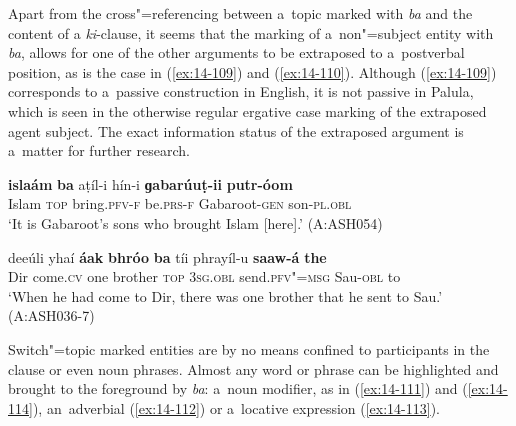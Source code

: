 Apart from the cross"=referencing between a~topic marked with \textit{ba} and the content of a \textit{ki}-clause, it seems that the marking of a~non"=subject entity with \textit{ba}, allows for one of the other arguments to be extraposed to a~postverbal position, as is the case in (\ref{ex:14-109}) and (\ref{ex:14-110}). Although (\ref{ex:14-109}) corresponds to a~passive construction in English, it is not passive in Palula, which is seen in the otherwise regular ergative case marking of the extraposed agent subject. The exact information status of the extraposed argument is a~matter for further research.

\begin{exe}
\ex
\label{ex:14-109}
\gll \textbf{islaám} \textbf{ba} aṭíl-i hín-i \textbf{ɡabarúuṭ-ii} \textbf{putr-óom}\\
Islam \textsc{top} bring.\textsc{pfv-f} be.\textsc{prs-f} Gabaroot-\textsc{gen} son-\textsc{pl.obl }\\
\glt `It is Gabaroot's sons who brought Islam [here].' (A:ASH054)

\ex
\label{ex:14-110}
\gll deeúli yhaí \textbf{áak} \textbf{bhróo} \textbf{ba} tíi phrayíl-u \textbf{saaw-á} \textbf{the}\\
Dir come.\textsc{cv} one brother \textsc{top} \textsc{3sg.obl} send.\textsc{pfv"=msg} Sau-\textsc{obl} to\\
\glt `When he had come to Dir, there was one brother that he sent to Sau.' (A:ASH036-7)
\end{exe}

Switch"=topic marked entities are by no means confined to participants in the clause or even noun phrases. Almost any word or phrase can be highlighted and brought to the foreground by \textit{ba}: a~noun modifier, as in (\ref{ex:14-111}) and (\ref{ex:14-114}), an~adverbial (\ref{ex:14-112}) or a~locative expression (\ref{ex:14-113}). 

